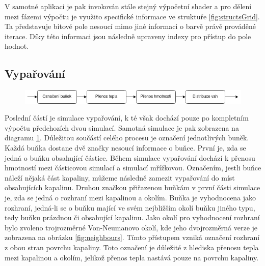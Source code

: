 V samotné aplikaci je pak invokován stále stejný výpočetní shader a pro dělení mezi fázemi výpočtu je využito specifické informace ve struktuře \ref{fig:structsGrid}. Ta představuje bitové pole nesoucí mimo jiné informaci o barvě právě prováděné iterace. Díky této informaci jsou následně upraveny indexy pro přístup do pole hodnot.

\subsection{Vypařování}
\label{chapter:simEvap}

\begin{figure}[hb!]
	\centering
	\captionsetup{justification=centering}
	\includegraphics[scale=0.6]{obrazky-figures/EvapFlow.png}
	\label{fig:EvapFlow}
\end{figure}

Poslední částí je simulace vypařování, k té však dochází pouze po kompletním výpočtu předchozích dvou simulací. Samotná simulace je pak zobrazena na diagramu \ref{fig:EvapFlow}. Důležitou součástí celého procesu je označení jednotlivých buněk. Každá buňka dostane dvě značky nesoucí informace o buňce. První je, zda se jedná o buňku obsahující částice. Během simulace vypařování dochází k přenosu hmotností mezi částicovou simulací a simulací mřížkovou. Označením, jestli buňce náleží nějaká část kapaliny, můžeme následně zamezit vypařování do míst obsahujících kapalinu. Druhou značkou přiřazenou buňkám v první části simulace je, zda se jedná o rozhraní mezi kapalinou a okolím. Buňka je vyhodnocena jako rozhraní, jedná-li se o buňku mající ve svém nejbližším okolí buňku jiného typu, tedy buňku prázdnou či obsahující kapalinu. Jako okolí pro vyhodnocení rozhraní bylo zvoleno trojrozměrné Von-Neumanovo okolí, kde jeho dvojrozměrná verze je zobrazena na obrázku \ref{fig:neighbours}. Tímto přístupem vzniká označení rozhraní z obou stran povrchu kapaliny. Toto označení je důležité z hlediska přenosu tepla mezi kapalinou a okolím, jelikož přenos tepla nastává pouze na povrchu kapaliny. 

